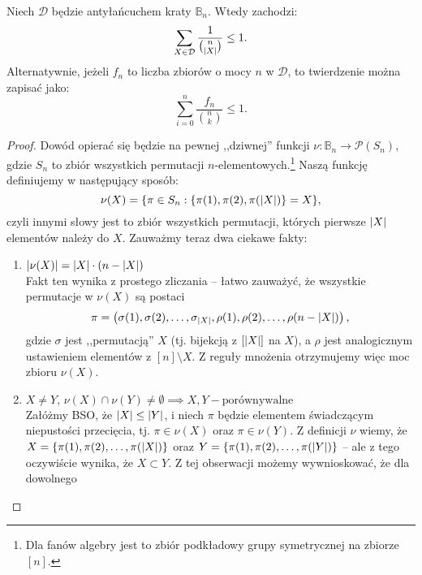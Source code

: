 \begin{theorem}
	Niech \(\mathcal{D}\) będzie antyłańcuchem kraty \(\mathbb B_n\).
	Wtedy zachodzi:
	\begin{equation}
		\sum_{X \in \mathcal{D}} \frac{1}{\binom{n}{\card{X}}} \leq 1.
	\end{equation}
	Alternatywnie, jeżeli \(f_n\) to liczba zbiorów o mocy \(n\) w \(\mathcal{D}\),
	to twierdzenie można zapisać jako:
	\begin{equation}
		\sum_{i=0}^{n} \frac{f_n}{\binom{n}{k}} \leq 1.
	\end{equation}
\end{theorem}

\begin{proof}
	Dowód opierać się będzie na pewnej ,,dziwnej'' funkcji \(\nu: \mathbb B_n \to \mathcal{P}(S_n)\),
	gdzie \(S_n\) to zbiór wszystkich permutacji \(n\)-elementowych.\footnote{Dla fanów algebry jest to zbiór podkładowy grupy symetrycznej na zbiorze \([n]\).}
	Naszą funkcję definiujemy w następujący sposób:
	\[\nu(X) = \set{\pi \in S_n: \set{\pi(1), \pi(2), \pi(\card{X})} = X},\]
	czyli innymi słowy jest to zbiór wszystkich permutacji, których pierwsze \(\card{X}\)
	elementów należy do \(X\). Zauważmy teraz dwa ciekawe fakty:
	\begin{enumerate}
		\item \(\card{\nu(X)} = \card{X} \cdot (n - \card{X})\) \\
		      Fakt ten wynika z prostego zliczania -- łatwo zauważyć, że wszystkie permutacje
		      w \(\nu(X)\) są postaci \[\pi = \left(\sigma(1), \sigma(2), \ldots, \sigma_{\card{X}},
			      \rho(1), \rho(2), \ldots, \rho(n - \card{X})\right),\]
		      gdzie \(\sigma\) jest ,,permutacją'' \(X\) (tj. bijekcją z \([\card{X}]\) na \(X\)),
		      a \(\rho\) jest analogicznym ustawieniem elementów z \([n] \setminus X\). Z reguły mnożenia
		      otrzymujemy więc moc zbioru \(\nu(X)\).
		\item \(X \neq Y,\, \nu(X) \cap \nu(Y) \neq \emptyset \implies X, Y - \text{porównywalne}\) \\
		      Załóżmy BSO, że \(\card{X} \leq \card{Y}\), i niech \(\pi\) będzie elementem świadczącym
		      niepustości przecięcia, tj. \(\pi \in \nu(X)\) oraz \(\pi \in \nu(Y)\). Z definicji \(\nu\)
		      wiemy, że \(X = \set{\pi(1), \pi(2), \ldots, \pi(\card{X})}\) oraz
		      \(Y = \set{\pi(1), \pi(2), \ldots, \pi(\card{Y})}\) -- ale z tego oczywiście
		      wynika, że \(X \subset Y\). Z tej obserwacji możemy wywnioskować, że dla dowolnego

\end{enumerate}
\end{proof}

